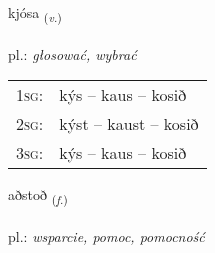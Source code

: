 \documentclass[frontgrid, backgrid]{flacards}\usepackage[]{graphicx}\usepackage[]{xcolor}
\begin{document}
\renewcommand{\flhead}{\vskip5pt \fboxsep=0pt {\small\bfseries\footnotesize Sagnorð | czasownik}}
\renewcommand{\fcfoot}{\vskip5pt \fboxsep=0pt \hspace{2pt}{\small\bfseries\footnotesize 1K}}

\renewcommand{\blhead}{\vskip5pt {\small\bfseries\footnotesize Sagnorð | czasownik }}
\renewcommand{\bcfoot}{\vskip5pt \hspace{2pt}{\small\bfseries\footnotesize 1K}}


{kjósa \small{\textsubscript{(\textit{v.})}} \\[1ex] %
\textphonetic{[cʰouːsa]} \\
pl.: \emph{głosować, wybrać} \\  [2ex]
\renewcommand*{\arraystretch}{0.8}
\begin{tabular}{p{1cm}l}
\textsc{1sg}: & kýs -- kaus -- kosið \\ 
\textsc{2sg}: & kýst -- kaust -- kosið \\ 
\textsc{3sg}: & kýs -- kaus -- kosið \\ 
\end{tabular}
}

\renewcommand{\flhead}{\vskip5pt \fboxsep=0pt {\small\bfseries\footnotesize Nafnorð | rzeczownik}}
\renewcommand{\fcfoot}{\vskip5pt \fboxsep=0pt \hspace{2pt}{\small\bfseries\footnotesize 1K}}

\renewcommand{\blhead}{\vskip5pt {\small\bfseries\footnotesize Nafnorð | rzeczownik }}
\renewcommand{\bcfoot}{\vskip5pt \hspace{2pt}{\small\bfseries\footnotesize 1K}}


{aðstoð \small{\textsubscript{(\textit{f.})}} \\[1ex] %
\textphonetic{[aðstɔð]} \\
pl.: \emph{wsparcie, pomoc, pomocność} \\  [2ex]
\renewcommand*{\arraystretch}{0.8}
}
\end{document}
